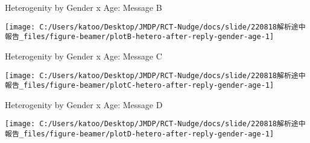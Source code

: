 \documentclass[
      aspectratio=169,
        12pt,
    ]{beamer}
\begin{document}
\begin{frame}{Heterogenity by Gender x Age: Message B}
\protect\hypertarget{heterogenity-by-gender-x-age-message-b}{}
\begin{center}\texttt{[image: C:/Users/katoo/Desktop/JMDP/RCT-Nudge/docs/slide/220818解析途中報告\_files/figure-beamer/plotB-hetero-after-reply-gender-age-1]} \end{center}
\end{frame}

\begin{frame}{Heterogenity by Gender x Age: Message C}
\protect\hypertarget{heterogenity-by-gender-x-age-message-c}{}
\begin{center}\texttt{[image: C:/Users/katoo/Desktop/JMDP/RCT-Nudge/docs/slide/220818解析途中報告\_files/figure-beamer/plotC-hetero-after-reply-gender-age-1]} \end{center}
\end{frame}

\begin{frame}{Heterogenity by Gender x Age: Message D}
\protect\hypertarget{heterogenity-by-gender-x-age-message-d}{}
\begin{center}\texttt{[image: C:/Users/katoo/Desktop/JMDP/RCT-Nudge/docs/slide/220818解析途中報告\_files/figure-beamer/plotD-hetero-after-reply-gender-age-1]} \end{center}
\end{frame}
\end{document}
